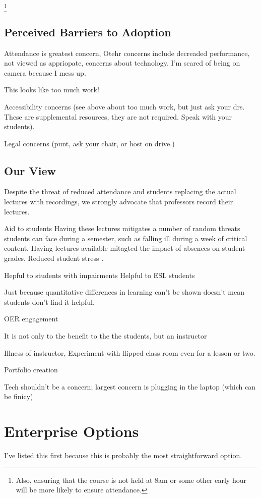 \documentclass[sigconf]{acmart}
\begin{document}
\footnote{Also, ensuring that the course is not held at 8am or some other early hour will be more likely to ensure attendance.}

\subsection{Perceived Barriers to Adoption}
Attendance is greatest concern,\cite{maynor2013student}
Otehr concerns include decreaded performance, not viewed as appriopate, concerns about technology.\cite{maynor2013student}
I'm scared of being on camera because I mess up.

This looks like too much work!

Accessibility concerns (see above about too much work, but just ask your drs.  These are supplemental resources, they are not required.  Speak with your students).

Legal concerns (punt, ask your chair, or host on drive.)


\subsection{Our View}
Despite the threat of reduced attendance and students replacing the actual lectures with recordings, we strongly advocate that professors record their lectures.


Aid to students
Having these lectures mitigates a number of random threats students can face during a semester, such as falling ill during a week of critical content.
Having lectures available mitagted the impact of absences on student grades\cite{traphagan2010impact}.
Reduced student stress \cite{traphagan2010impact}.

Hepful to students with impairments 
Helpful to ESL students


Just because quantitative differences in learning can't be shown doesn't mean students don't find it helpful.


OER engagement \cite{llamas2014generating}


It is not only to the benefit to the the students, but an instructor

Illness of instructor, 
Experiment with flipped class room even for a lesson or two.

Portfolio creation

Tech shouldn't be a concern; largest concern is plugging in the laptop (which can be finicy)

\section{Enterprise Options}
\label{enter}
I've listed this first because this is probably the most straightforward option.
\end{document}
